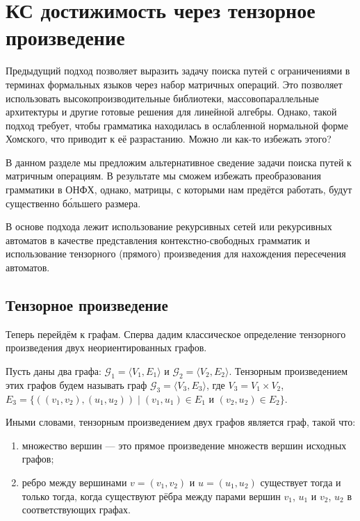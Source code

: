 \chapter{КС достижимость через тензорное произведение}

Предыдущий подход позволяет выразить задачу поиска путей с ограничениями в терминах формальных языков через набор матричных операций.
Это позволяет использовать высокопроизводительные библиотеки, массовопараллельные архитектуры и другие готовые решения для линейной алгебры.
Однако, такой подход требует, чтобы грамматика находилась в ослабленной нормальной форме Хомского, что приводит к её разрастанию.
Можно ли как-то избежать этого?

В данном разделе мы предложим альтернативное сведение задачи поиска путей к матричным операциям.
В результате мы сможем избежать преобразования грамматики в ОНФХ, однако, матрицы, с которыми нам предётся работать, будут существенно б\'{о}льшего размера.

В основе подхода лежит использование рекурсивных сетей или рекурсивных автоматов в качестве представления контекстно-свободных грамматик и использование тензорного (прямого) произведения для нахождения пересечения автоматов.



\section{Тензорное произведение}
\label{section2}

Теперь перейдём к графам.
Сперва дадим классическое определение тензорного произведения двух неориентированных графов.

\begin{definition}
Пусть даны два графа: $\mathcal{G}_1 = \langle V_1, E_1\rangle$ и $\mathcal{G}_2 = \langle V_2, E_2\rangle$.
Тензорным произведением этих графов будем называть граф $\mathcal{G}_3 = \langle V_3, E_3\rangle$, где $V_3 = V_1 \times V_2$, $E_3 = \{ ((v_1,v_2),(u_1,u_2)) \mid (v_1,u_1) \in E_1 \text{ и } (v_2,u_2) \in E_2 \}$.
\end{definition}

Иными словами, тензорным произведением двух графов является граф, такой что:
\begin{enumerate}
 \item множество вершин --- это прямое произведение множеств вершин исходных графов;
 \item ребро между вершинами $v=(v_1,v_2)$ и $u=(u_1,u_2)$ существует тогда и только тогда, когда существуют рёбра между парами вершин $v_1$, $u_1$ и $v_2$, $u_2$ в соответствующих графах.
\end{enumerate}


